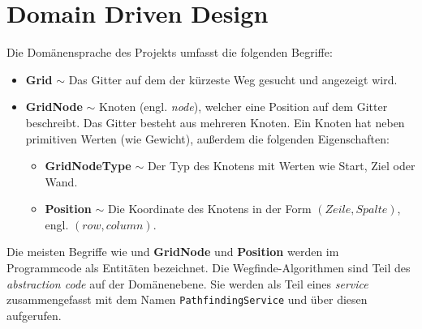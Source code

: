 \part{Domain Driven Design}
Die Domänensprache des Projekts umfasst die folgenden Begriffe:
\begin{itemize}
  \item \textbf{Grid} $\sim$ Das Gitter auf dem der kürzeste Weg gesucht und
        angezeigt wird.
  \item \textbf{GridNode} $\sim$ Knoten (engl. \textit{node}),
        welcher eine Position auf dem Gitter beschreibt. Das
        Gitter besteht aus mehreren Knoten. Ein Knoten hat neben
        primitiven Werten (wie Gewicht), außerdem die
        folgenden Eigenschaften:
        \begin{itemize}[topsep=0pt]
          \item \textbf{GridNodeType} $\sim$ Der Typ des Knotens mit Werten
                wie Start, Ziel oder Wand.
          \item \textbf{Position} $\sim$ Die Koordinate des Knotens in der
                Form $(Zeile,Spalte)$, engl. $(row,column)$.
        \end{itemize}
\end{itemize}
Die meisten Begriffe wie und \textbf{GridNode} und \textbf{Position}
werden im Programmcode als Entitäten bezeichnet. Die
Wegfinde-Algorithmen sind Teil des \textit{abstraction code} auf
der Domänenebene. Sie werden als Teil eines \textit{service}
zusammengefasst mit dem Namen \texttt{Path\-findingService} und
über diesen aufgerufen.